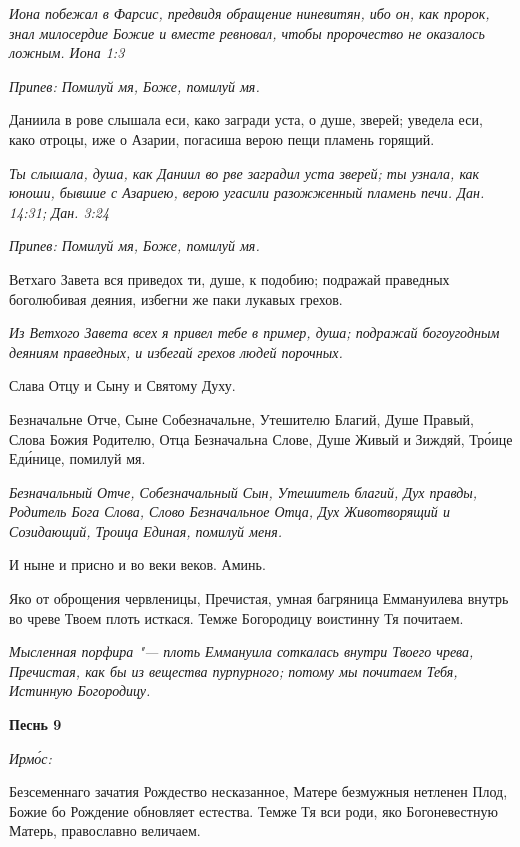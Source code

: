 \itshape Иона побежал в Фарсис, предвидя обращение ниневитян, ибо он, как пророк, знал милосердие Божие и вместе ревновал, чтобы пророчество не оказалось ложным. Иона 1:3\normalfont{}


\itshape Припев:\normalfont{} Помилуй мя, Боже, помилуй мя.


Даниила в рове слышала еси, како загради уста, о душе, зверей; уведела еси, како отроцы, иже о Азарии, погасиша верою пещи пламень горящий.


\itshape Ты слышала, душа, как Даниил во рве заградил уста зверей; ты узнала, как юноши, бывшие с Азариею, верою угасили разожженный пламень печи. Дан. 14:31; Дан. 3:24\normalfont{}


\itshape Припев:\normalfont{} Помилуй мя, Боже, помилуй мя.


Ветхаго Завета вся приведох ти, душе, к подобию; подражай праведных боголюбивая деяния, избегни же паки лукавых грехов.


\itshape Из Ветхого Завета всех я привел тебе в пример, душа; подражай богоугодным деяниям праведных, и избегай грехов людей порочных.\normalfont{}


Слава Отцу и Сыну и Святому Духу.


Безначальне Отче, Сыне Собезначальне, Утешителю Благий, Душе Правый, Слова Божия Родителю, Отца Безначальна Слове, Душе Живый и Зиждяй, Тро́ице Еди́нице, помилуй мя.


\itshape Безначальный Отче, Собезначальный Сын, Утешитель благий, Дух правды, Родитель Бога Слова, Слово Безначальное Отца, Дух Животворящий и Созидающий, Троица Единая, помилуй меня.\normalfont{}


И ныне и присно и во веки веков. Аминь.


Яко от оброщения червленицы, Пречистая, умная багряница Еммануилева внутрь во чреве Твоем плоть исткася. Темже Богородицу воистинну Тя почитаем.


\itshape Мысленная порфира "--- плоть Еммануила соткалась внутри Твоего чрева, Пречистая, как бы из вещества пурпурного; потому мы почитаем Тебя, Истинную Богородицу.\normalfont{}





\bfseries Песнь 9\normalfont{}


\itshape Ирмо́с:\normalfont{}


Безсеменнаго зачатия Рождество несказанное, Матере безмужныя нетленен Плод, Божие бо Рождение обновляет естества. Темже Тя вси роди, яко Богоневестную Матерь, православно величаем.


